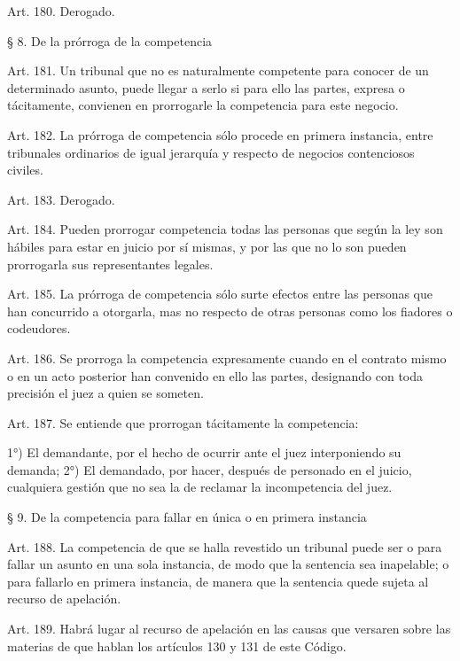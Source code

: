     Art. 180. Derogado.



    § 8. De la prórroga de la competencia




    Art. 181. Un tribunal que no es naturalmente competente para conocer de un determinado asunto, puede llegar a serlo si para ello las partes, expresa o tácitamente, convienen en prorrogarle la competencia para este negocio.


    Art. 182. La prórroga de competencia sólo procede en primera instancia, entre tribunales ordinarios de igual jerarquía y respecto de negocios contenciosos civiles.

    Art. 183. Derogado.



    Art. 184. Pueden prorrogar competencia todas las personas que según la ley son hábiles para estar en juicio por sí mismas, y por las que no lo son pueden prorrogarla sus representantes legales.



    Art. 185. La prórroga de competencia sólo surte efectos entre las personas que han concurrido a otorgarla, mas no respecto de otras personas como los fiadores o codeudores.



    Art. 186. Se prorroga la competencia expresamente cuando en el contrato mismo o en un acto posterior han convenido en ello las partes, designando con toda precisión el juez a quien se someten.


    Art. 187. Se entiende que prorrogan tácitamente la competencia:

    1°) El demandante, por el hecho de ocurrir ante el juez interponiendo su demanda;
    2°) El demandado, por hacer, después de personado en el juicio, cualquiera gestión que no sea la de reclamar la incompetencia del juez.



    § 9. De la competencia para fallar en única o en primera instancia


    Art. 188. La competencia de que se halla revestido un tribunal puede ser o para fallar un asunto en una sola instancia, de modo que la sentencia sea inapelable; o para fallarlo en primera instancia, de manera que la sentencia quede sujeta al recurso de apelación.


    Art. 189. Habrá lugar al recurso de apelación en las causas que versaren sobre las materias de que hablan los artículos 130 y 131 de este Código.

